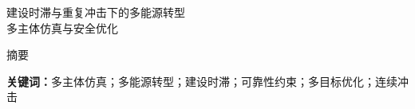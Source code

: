 \documentclass[UTF8,fontset=windows,zihao=-4]{ctexart}
\begin{document}
\begin{center}{\heiti{}建设时滞与重复冲击下的多能源转型\\多主体仿真与安全优化}\end{center}
\begin{center}\heiti{}摘要\end{center}
\par\medskip
\noindent\textbf{关键词：}多主体仿真；多能源转型；建设时滞；可靠性约束；多目标优化；连续冲击
\thispagestyle{fancy}\clearpage\tableofcontents\clearpage








\FloatBarrier\clearpage


\appendix

\end{document}
